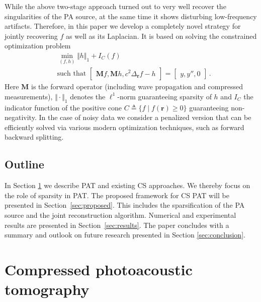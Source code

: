 \documentclass[11pt]{article}
\newcommand{\rr}{\mathbf r}
\newcommand{\data}{y}
\newcommand{\source}{f}
\newcommand{\Lsource}{h}
\newcommand\norm[1]{\Vert#1\Vert}
\newcommand{\set}[1]{\{#1\}}
\newcommand{\edot}{\cdot}
\newcommand{\fullop}{\mathbf M}
\begin{document}
While the above two-stage  approach turned out to very well recover the
singularities of  the PA source,
at the same time it shows disturbing low-frequency artifacts. Therefore, in this paper
we develop a completely novel  strategy for jointly recovering $\source$ as well as its
Laplacian. It is based on solving the constrained optimization problem
\begin{equation*}
	\begin{aligned}
		&\min_{(\source, \Lsource)}    \norm{\Lsource}_1  +  I_{C} (\source)  \\
		&\text{such that }
		\begin{bmatrix} \fullop \source, \fullop\Lsource , c^2 \Delta_{\rr} \source  -    \Lsource \end{bmatrix} =
		\begin{bmatrix} \data , \data'' ,0 \end{bmatrix}   \,.
	\end{aligned}
\end{equation*}
Here $\fullop$ is the forward operator (including wave propagation and compressed
measurements),
$\norm{\edot }_1$ denotes the $\ell^1$-norm guaranteeing
sparsity of $\Lsource$ and $I_C $ the indicator
function of the positive cone $ C  \triangleq \set{\source \mid  \source(\rr) \geq 0 }$
guaranteeing  non-negativity.
In the  case of noisy data we consider a penalized  version that can be
efficiently solved via various modern optimization techniques, such as
forward backward splitting.

\subsection{Outline}
\label{ssec:outline}
In Section \ref{sec:CSPAT} we describe PAT and  existing
CS approaches. We thereby focus on the role of sparsity
in PAT. The proposed framework for CS PAT will be presented in
Section~\ref{sec:proposed}. This includes the sparsification of the PA source and
the joint reconstruction algorithm. Numerical and experimental results are presented
in Section~\ref{sec:results}. The paper concludes with a summary and outlook on future research presented in  Section \ref{sec:conclusion}.



\section{Compressed photoacoustic tomography}

\label{sec:CSPAT}
\end{document}
